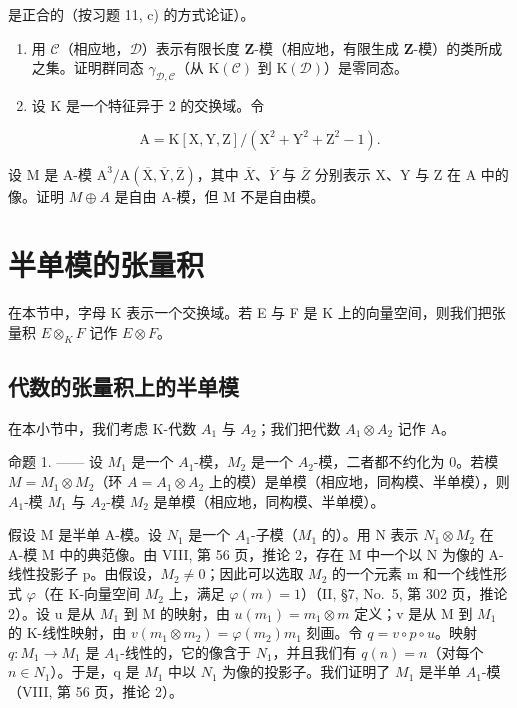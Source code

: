 是正合的（按习题 11, c) 的方式论证）。

\begin{enumerate}
\def\labelenumi{\arabic{enumi})}
\setcounter{enumi}{12}
\item
  用 \(\mathcal{C}\)（相应地，\(\mathcal{D}\)）表示有限长度 \(\mathbf{Z}\)-模（相应地，有限生成 \(\mathbf{Z}\)-模）的类所成之集。证明群同态 \(\gamma_{\mathcal{D},\mathcal{C}}\)（从 \(\mathrm{K}(\mathcal{C})\) 到 \(\mathrm{K}(\mathcal{D})\)）是零同态。
\item
  设 K 是一个特征异于 2 的交换域。令
\end{enumerate}

\[
\mathrm{A} = \mathrm{K} [ \mathrm{X}, \mathrm{Y}, \mathrm{Z} ] / (\mathrm{X} ^ {2} + \mathrm{Y} ^ {2} + \mathrm{Z} ^ {2} - 1).
\]

设 M 是 A-模 \(\mathrm{A}^{3}/\mathrm{A}(\overline{\mathrm{X}},\overline{\mathrm{Y}},\overline{\mathrm{Z}})\)，其中 \(\overline{X}\)、\(\overline{Y}\) 与 \(\overline{Z}\) 分别表示 X、Y 与 Z 在 A 中的像。证明 \(M\oplus A\) 是自由 A-模，但 M 不是自由模。

\section{半单模的张量积}

在本节中，字母 K 表示一个交换域。若 E 与 F 是 K 上的向量空间，则我们把张量积 \(E \otimes_{K} F\) 记作 \(E \otimes F\)。

\subsection{代数的张量积上的半单模}

在本小节中，我们考虑 K-代数 \(A_{1}\) 与 \(A_{2}\)；我们把代数 \(A_{1} \otimes A_{2}\) 记作 A。

命题 1. —— 设 \(M_{1}\) 是一个 \(A_{1}\)-模，\(M_{2}\) 是一个 \(A_{2}\)-模，二者都不约化为 0。若模 \(M = M_{1} \otimes M_{2}\)（环 \(A = A_{1} \otimes A_{2}\) 上的模）是单模（相应地，同构模、半单模），则 \(A_{1}\)-模 \(M_{1}\) 与 \(A_{2}\)-模 \(M_{2}\) 是单模（相应地，同构模、半单模）。

假设 M 是半单 A-模。设 \(N_{1}\) 是一个 \(A_{1}\)-子模（\(M_{1}\) 的）。用 N 表示 \(N_{1} \otimes M_{2}\) 在 A-模 M 中的典范像。由 VIII, 第 56 页，推论 2，存在 M 中一个以 N 为像的 A-线性投影子 p。由假设，\(M_{2} \neq 0\)；因此可以选取 \(M_{2}\) 的一个元素 m 和一个线性形式 \(\varphi\)（在 K-向量空间 \(M_{2}\) 上，满足 \(\varphi(m) = 1\)）（II, §7, No.~5, 第 302 页，推论 2）。设 u 是从 \(M_{1}\) 到 M 的映射，由 \(u(m_{1}) = m_{1} \otimes m\) 定义；v 是从 M 到 \(M_{1}\) 的 K-线性映射，由 \(v(m_{1} \otimes m_{2}) = \varphi(m_{2})m_{1}\) 刻画。令 \(q = v \circ p \circ u\)。映射 \(q : M_{1} \to M_{1}\) 是 \(A_{1}\)-线性的，它的像含于 \(N_{1}\)，并且我们有 \(q(n) = n\)（对每个 \(n \in N_{1}\)）。于是，q 是 \(M_{1}\) 中以 \(N_{1}\) 为像的投影子。我们证明了 \(M_{1}\) 是半单 \(A_{1}\)-模（VIII, 第 56 页，推论 2）。

